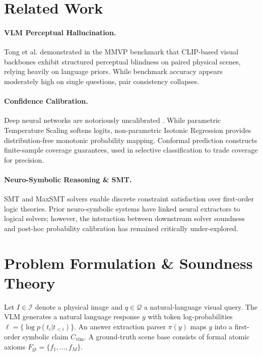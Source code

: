 \documentclass[10pt,twocolumn,letterpaper]{article}
\begin{document}
\section{Related Work}
\paragraph{VLM Perceptual Hallucination.} Tong et al. \cite{tong2024eyes} demonstrated in the MMVP benchmark that CLIP-based visual backbones exhibit structured perceptual blindness on paired physical scenes, relying heavily on language priors. While benchmark accuracy appears moderately high on single questions, pair consistency collapses.

\paragraph{Confidence Calibration.} Deep neural networks are notoriously uncalibrated \cite{guo2017calibration}. While parametric Temperature Scaling softens logits, non-parametric Isotonic Regression \cite{zadrozny2002transforming} provides distribution-free monotonic probability mapping. Conformal prediction \cite{angelopoulos2021gentle} constructs finite-sample coverage guarantees, used in selective classification \cite{geifman2017selective} to trade coverage for precision.

\paragraph{Neuro-Symbolic Reasoning \& SMT.} SMT and MaxSMT solvers \cite{demoura2008z3} enable discrete constraint satisfaction over first-order logic theories. Prior neuro-symbolic systems have linked neural extractors to logical solvers; however, the interaction between downstream solver soundness and post-hoc probability calibration has remained critically under-explored.

\section{Problem Formulation \& Soundness Theory}

Let $I \in \mathcal{I}$ denote a physical image and $q \in \mathcal{Q}$ a natural-language visual query. The VLM generates a natural language response $y$ with token log-probabilities $\ell = \{\log p(t_i | t_{<i})\}$. An answer extraction parser $\pi(y)$ maps $y$ into a first-order symbolic claim $C_{\text{vlm}}$. A ground-truth scene base consists of formal atomic axioms $F_{\text{gt}} = \{f_1, \dots, f_M\}$.
\end{document}
